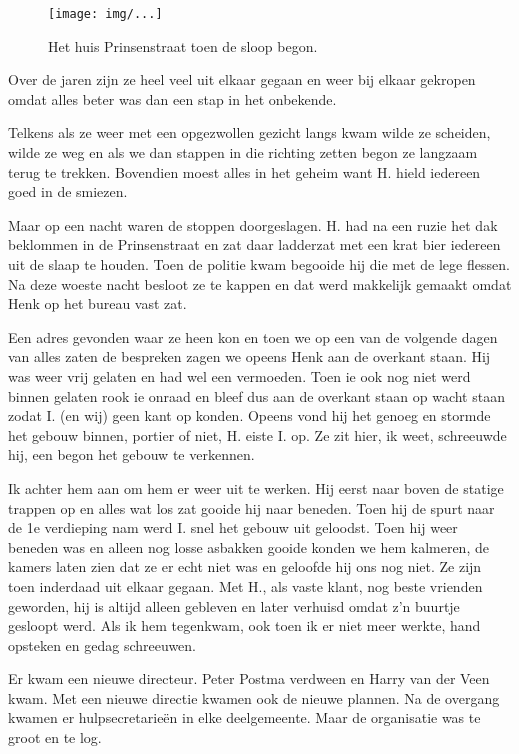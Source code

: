 \documentclass[10pt,twoside,openright]{memoir}
\begin{document}
\begin{figure}[t]
\texttt{[image: img/...]}
\caption{Het huis Prinsenstraat toen de sloop begon.}
\end{figure}

Over de jaren zijn ze heel veel uit elkaar gegaan en weer bij elkaar gekropen omdat alles beter was dan een stap in het onbekende. 

Telkens als ze weer met een opgezwollen gezicht langs kwam wilde ze scheiden, wilde ze weg en als we dan stappen in die richting zetten begon ze langzaam terug te trekken. Bovendien moest alles in het geheim want H. hield iedereen goed in de smiezen. 

Maar op een nacht waren de stoppen doorgeslagen. H. had na een ruzie het dak beklommen in de Prinsenstraat en zat daar ladderzat met een krat bier iedereen uit de slaap te houden. Toen de politie kwam begooide hij die met de lege flessen. Na deze woeste nacht besloot ze te kappen en dat werd makkelijk gemaakt omdat Henk op het bureau vast zat. 

Een adres gevonden waar ze heen kon en toen we op een van de volgende dagen van alles zaten de bespreken zagen we opeens Henk aan de overkant staan. Hij was weer vrij gelaten en had wel een vermoeden. Toen ie ook nog niet werd binnen gelaten rook ie onraad en bleef dus aan de overkant staan op wacht staan zodat I. (en wij) geen kant op konden. Opeens vond hij het genoeg en stormde het gebouw binnen, portier of niet, H. eiste I. op. Ze zit hier, ik weet, schreeuwde hij, een begon het gebouw te verkennen. 

Ik achter hem aan om hem er weer uit te werken. Hij eerst naar boven de statige trappen op en alles wat los zat gooide hij naar beneden. Toen hij de spurt naar de 1e verdieping nam werd I. snel het gebouw uit geloodst. Toen hij weer beneden was en alleen nog losse asbakken gooide konden we hem kalmeren, de kamers laten zien dat ze er echt niet was en geloofde hij ons nog niet. Ze zijn toen inderdaad uit elkaar gegaan. Met H., als vaste klant, nog beste vrienden geworden, hij is altijd alleen gebleven en later verhuisd omdat z’n buurtje gesloopt werd. Als ik hem tegenkwam, ook toen ik er niet meer werkte, hand opsteken en gedag schreeuwen.

Er kwam een nieuwe directeur. Peter Postma verdween en Harry van der Veen kwam. Met een nieuwe directie kwamen ook de nieuwe plannen. Na de overgang kwamen er hulpsecretarieën in elke deelgemeente. Maar de organisatie was te groot en te log. 
\end{document}
